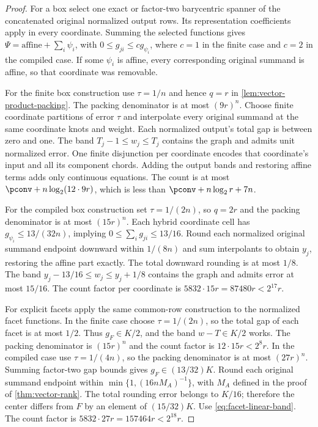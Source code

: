 \begin{proof}
For a box select one exact or factor-two barycentric spanner of the
concatenated original normalized output rows. Its representation
coefficients apply in every coordinate. Summing the selected functions
gives $\Psi=\text{affine}+\sum_i\psi_i$, with
$0\le g_{ji}\le c g_{\psi_i}$, where $c=1$ in the finite case and
$c=2$ in the compiled case. If some $\psi_i$ is affine, every
corresponding original summand is affine, so that coordinate was removable.

For the finite box construction use $\tau=1/n$ and hence $q=r$ in
\cref{lem:vector-product-packing}. The packing denominator is at most
$(9r)^n$. Choose finite coordinate partitions of error $\tau$ and
interpolate every original summand at the same coordinate knots and
weight. Each normalized output's total gap is between zero and one.
The band $T_j-1\le w_j\le T_j$ contains the graph and admits unit
normalized error. One finite disjunction per coordinate encodes that
coordinate's input and all its component chords. Adding the output
bands and restoring affine terms adds only continuous equations.
The count is at most $\pconv+n\log_2(12\cdot9r)$, which is less
than $\pconv+n\log_2r+7n$.

For the compiled box construction set $\tau=1/(2n)$, so $q=2r$
and the packing denominator is at most $(15r)^n$.
Each hybrid coordinate cell has $g_{\psi_i}\le13/(32n)$, implying
$0\le\sum_i g_{ji}\le13/16$. Round each normalized original
summand endpoint downward within $1/(8n)$ and sum interpolants to
obtain $y_j$, restoring the affine part exactly. The total downward
rounding is at most $1/8$. The band
$y_j-13/16\le w_j\le y_j+1/8$ contains the graph and admits error
at most $15/16$. The count factor per coordinate is
$5832\cdot15r=87480r<2^{17}r$.

For explicit facets apply the same common-row construction to the
normalized facet functions. In the finite case choose $\tau=1/(2n)$,
so the total gap of each facet is at most $1/2$. Thus $g_F\in K/2$,
and the band $w-T\in K/2$ works. The packing denominator is
$(15r)^n$ and the count factor is $12\cdot15r<2^8r$.
In the compiled case use $\tau=1/(4n)$, so the packing denominator
is at most $(27r)^n$. Summing factor-two gap bounds gives
$g_F\in(13/32)K$. Round each original summand endpoint within
$\min\{1,(16nM_A)^{-1}\}$, with $M_A$ defined in the proof of
\cref{thm:vector-rank}. The total rounding error belongs to $K/16$;
therefore the center differs from $F$ by an element of $(15/32)K$.
Use \eqref{eq:facet-linear-band}. The count factor is
$5832\cdot27r=157464r<2^{18}r$.


\end{proof}
